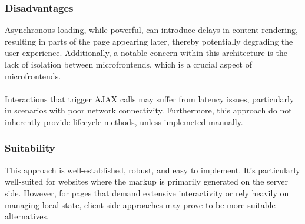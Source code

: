 \subsubsection{Disadvantages}
Asynchronous loading, while powerful, can introduce delays in content rendering, resulting in parts of the page appearing later, thereby potentially degrading the user experience. Additionally, a notable concern within this architecture is the lack of isolation between microfrontends, which is a crucial aspect of microfrontends. \\\\
Interactions that trigger AJAX calls may suffer from latency issues, particularly in scenarios with poor network connectivity. Furthermore, this approach do not inherently provide lifecycle methods, unless implemeted manually. \cite{MicrofrontendsInAction}

\subsubsection{Suitability}
This approach is well-established, robust, and easy to implement. It's particularly well-suited for websites where the markup is primarily generated on the server side. However, for pages that demand extensive interactivity or rely heavily on managing local state, client-side approaches may prove to be more suitable alternatives.

